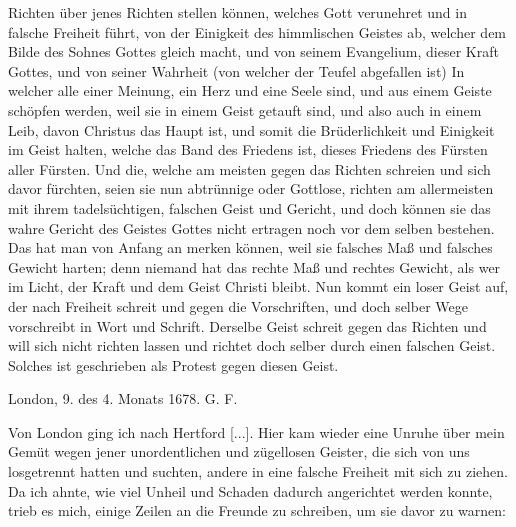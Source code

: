 {    Richten über jenes Richten stellen können, welches Gott
    verunehret und in falsche Freiheit 
    führt, von der Einigkeit des
    himmlischen Geistes ab, welcher dem Bilde des Sohnes Gottes
    gleich macht, und von seinem Evangelium, dieser Kraft Gottes,
    und von seiner Wahrheit (von welcher der Teufel abgefallen ist)
    In welcher alle einer Meinung, ein Herz und eine Seele sind, und
    aus einem Geiste schöpfen werden, weil sie in einem Geist
    getauft sind, und also auch in einem Leib, davon Christus das
    Haupt ist, und somit die Brüderlichkeit und Einigkeit im Geist
    halten, welche das Band des Friedens ist, dieses Friedens des
    Fürsten aller Fürsten. Und die, welche am meisten gegen das
    Richten schreien und sich davor fürchten, seien sie nun abtrünnige
     oder Gottlose, richten am allermeisten mit ihrem
    tadelsüchtigen, falschen Geist und Gericht, 
    und doch können sie das
    wahre Gericht des Geistes Gottes nicht ertragen noch vor dem
    selben bestehen. Das hat man von Anfang an merken können,
    weil sie falsches Maß und falsches Gewicht harten; denn niemand
    hat das rechte Maß und rechtes Gewicht, als wer im Licht,
    der Kraft und dem Geist Christi bleibt. Nun kommt ein loser
    Geist auf, der nach Freiheit schreit und gegen die Vorschriften,
    und doch selber Wege vorschreibt in Wort und Schrift. Derselbe
    Geist schreit gegen das Richten und will sich nicht richten lassen
    und richtet doch selber durch einen falschen Geist. Solches ist
    geschrieben als Protest gegen diesen Geist.

    \bigskip 
    \begin{flushright}
    London, 9. des 4. Monats 1678. G. F.\end{flushright}
}

Von London ging ich nach Hertford [...]. Hier kam wieder
eine Unruhe über mein Gemüt wegen jener unordentlichen und
zügellosen Geister, die sich von uns losgetrennt hatten und suchten,
andere in eine falsche Freiheit mit sich zu ziehen. 
Da ich ahnte,
wie viel Unheil und Schaden dadurch angerichtet werden konnte,
trieb es mich, einige Zeilen an die Freunde zu schreiben, um sie
davor zu warnen:


